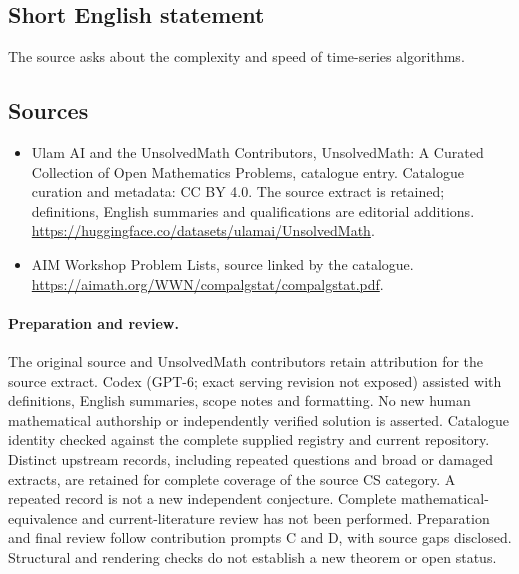 \documentclass[11pt]{article}
\begin{document}
\subsection{Short English statement}
The source asks about the complexity and speed of time-series algorithms.
\subsection{Sources}
\begin{itemize}
\item[\hypertarget{source:statement:1}{S1}] Ulam AI and the UnsolvedMath Contributors, UnsolvedMath: A Curated Collection of Open Mathematics Problems, catalogue entry. Catalogue curation and metadata: CC BY 4.0. The source extract is retained; definitions, English summaries and qualifications are editorial additions.
\url{https://huggingface.co/datasets/ulamai/UnsolvedMath}.
\item[\hypertarget{source:statement:2}{S2}] AIM Workshop Problem Lists, source linked by the catalogue.
\url{https://aimath.org/WWN/compalgstat/compalgstat.pdf}.
\end{itemize}
\paragraph{Preparation and review.}
The original source and UnsolvedMath contributors retain attribution for the source extract. Codex (GPT-6; exact serving revision not exposed) assisted with definitions, English summaries, scope notes and formatting. No new human mathematical authorship or independently verified solution is asserted. Catalogue identity checked against the complete supplied registry and current repository. Distinct upstream records, including repeated questions and broad or damaged extracts, are retained for complete coverage of the source CS category. A repeated record is not a new independent conjecture. Complete mathematical-equivalence and current-literature review has not been performed. Preparation and final review follow contribution prompts C and D, with source gaps disclosed. Structural and rendering checks do not establish a new theorem or open status.
\label{end:statement}
\end{document}
